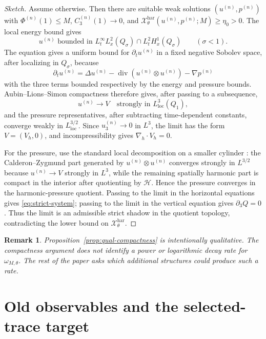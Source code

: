 \documentclass[11pt]{article}
\numberwithin{equation}{section}
\newtheorem{remark}[theorem]{Remark}
\newcommand{\loc}{\mathrm{loc}}
\newcommand{\har}{\mathrm{har}}
\newcommand{\divh}{\nabla_h\cdot}
\newcommand{\calH}{\mathcal H}
\newcommand{\calX}{\mathcal X}
\begin{document}
\begin{proof}[Sketch]
Assume otherwise.  Then there are suitable weak solutions \((u^{(n)},p^{(n)})\) with \(\Phi^{(n)}(1)\le M\), \(C_3^{(n)}(1)\to0\), and \(\calX^{\har}_{\theta}(u^{(n)},p^{(n)};M)\ge\eta_0>0\).  The local energy bound gives
\[
 u^{(n)} \text{ bounded in } L_t^\infty L_x^2(Q_\sigma)\cap L_t^2H_x^1(Q_\sigma)
 \qquad (\sigma<1).
\]
The equation gives a uniform bound for \(\partial_tu^{(n)}\) in a fixed negative Sobolev space, after localizing in \(Q_\sigma\), because
\[
 \partial_tu^{(n)}=
 \Delta u^{(n)}-\operatorname{div}(u^{(n)}\otimes u^{(n)})-\nabla p^{(n)}
\]
with the three terms bounded respectively by the energy and pressure bounds.  Aubin--Lions--Simon compactness \cite{Simon1986} therefore gives, after passing to a subsequence,
\[
 u^{(n)}\to V \quad\text{strongly in }L^3_{\loc}(Q_1),
\]
and the pressure representatives, after subtracting time-dependent constants, converge weakly in \(L^{3/2}_{\loc}\). Since \(u_3^{(n)}\to0\) in \(L^3\), the limit has the form \(V=(V_h,0)\), and incompressibility gives \(\divh V_h=0\).

For the pressure, use the standard local decomposition on a smaller cylinder \cite{CKN1982,SohrWahl1986,Wolf2017,Seregin2015}: the Calderon--Zygmund part generated by \(u^{(n)}\otimes u^{(n)}\) converges strongly in \(L^{3/2}\) because \(u^{(n)}\to V\) strongly in \(L^3\), while the remaining spatially harmonic part is compact in the interior after quotienting by \(\calH\).  Hence the pressure converges in the harmonic-pressure quotient. Passing to the limit in the horizontal equations gives \eqref{eq:strict-system}; passing to the limit in the vertical equation gives \(\partial_3Q=0\).  Thus the limit is an admissible strict shadow in the quotient topology, contradicting the lower bound on \(\calX^{\har}_\theta\).
\end{proof}

\begin{remark}
Proposition~\ref{prop:qual-compactness} is intentionally qualitative.  The compactness argument does not identify a power or logarithmic decay rate for \(\omega_{M,\theta}\).  The rest of the paper asks which additional structures could produce such a rate.
\end{remark}

\section{Old observables and the selected-trace target}\label{sec:atlas}
\end{document}
